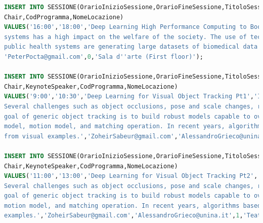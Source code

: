 \documentclass[a4page]{article}
\begin{document}
\begin{lstlisting}[language=SQL,
        deletekeywords={IDENTITY,INT},
        morekeywords={clustered},    
        framesep=10pt,
        framextopmargin=10pt]
INSERT INTO SESSIONE(OrarioInizioSessione,OrarioFineSessione,TitoloSessione,DescrizioneSessione,
Chair,CodProgramma,NomeLocazione)
VALUES('16:00','18:00','Deep Learning High Performance Computing to Boost Biomedical Applications','Healthcare is one of the key sectors of the global economy, especially in Europe. Any improvement in healthcare 
systems has a high impact on the welfare of the society. The use of technologies in health is clearly a strong path to more efficient healthcare, benefitting both individual people and the publicbudgets. European 
public health systems are generating large datasets of biomedical data in general, and images in particular, as most medical examinations use image-based processes.', 
'PeterPocta@gmail.com',0,'Sala d''arte (First floor)');

INSERT INTO SESSIONE(OrarioInizioSessione,OrarioFineSessione,TitoloSessione,DescrizioneSessione,
Chair,KeynoteSpeaker,CodProgramma,NomeLocazione)
VALUES('9:00','10:30','Deep Learning for Visual Object Tracking Pt1','In its simplest definition, visual object tracking consists in the persistent recognition and localization of a generic target object in a video. 
Several challenges such as object occlusions, pose and scale changes, rotations and shape variations, and the presence of similar objects, must be tackled to accurately keep track of a target''s position. The ultimate
goal of generic object tracking is to build robust models capable to overcome such challenging factors. In the past, such issues have been addressed by disparate principles formalizing the concepts of appearance
model, motion model, and matching operation. In recent years, algorithms based on deep learning tried to learn such conceptual blocks by exploiting the ability of deep neural networks in learning complex functions 
from visual examples.','ZoheirSabeur@gmail.com','AlessandroGrieco@unina.it',1,'Teatrino');
	   
INSERT INTO SESSIONE(OrarioInizioSessione,OrarioFineSessione,TitoloSessione,DescrizioneSessione,
Chair,KeynoteSpeaker,CodProgramma,NomeLocazione)
VALUES('11:00','13:00','Deep Learning for Visual Object Tracking Pt2','In its simplest definition, visual object tracking consists in the persistent recognition and localization of a generic target object in a video.
Several challenges such as object occlusions, pose and scale changes, rotations and shape variations, and the presence of similar objects, must be tackled to accurately keep track of a target''s position. The ultimate
goal of generic object tracking is to build robust models capable to overcome such challenging factors. In the past, such issues have been addressed by disparate principles formalizing the concepts of appearance model,
motion model, and matching operation. In recent years, algorithms based on deep learning tried to learn such conceptual blocks by exploiting the ability of deep neural networks in learning complex functions from visual 
examples.','ZoheirSabeur@gmail.com','AlessandroGrieco@unina.it',1,'Teatrino');	   


\end{lstlisting}
\end{document}
